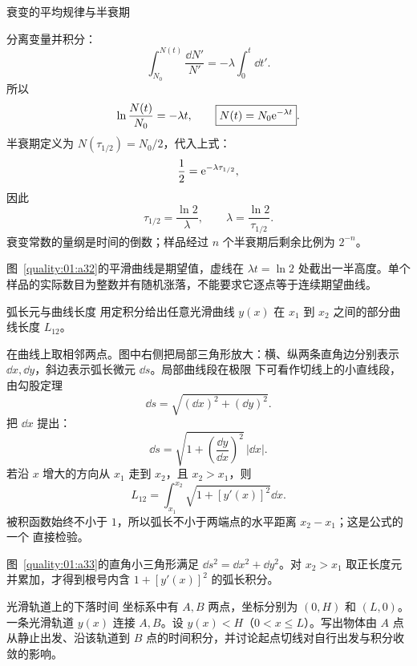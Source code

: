 {\begin{origexamplebox}{衰变的平均规律与半衰期}
\end{origexamplebox}

\begin{xesolution}
分离变量并积分：
\[
 \int_{N_0}^{N(t)}\frac{\dd N'}{N'}
 =-\lambda\int_0^t\dd t'.
\]
所以
\[
 \ln\frac{N(t)}{N_0}=-\lambda t,
 \qquad
 \boxed{N(t)=N_0\mathrm e^{-\lambda t}}.
\]
半衰期定义为 $N(\tau_{1/2})=N_0/2$，代入上式：
\[
 \frac12=\mathrm e^{-\lambda\tau_{1/2}},
\]
因此
\[
 \boxed{\tau_{1/2}=\frac{\ln2}{\lambda}},
 \qquad
 \boxed{\lambda=\frac{\ln2}{\tau_{1/2}}}.
\]
衰变常数的量纲是时间的倒数；样品经过 $n$ 个半衰期后剩余比例为 $2^{-n}$。


图~\ref{quality:01:a32}的平滑曲线是期望值，虚线在 $\lambda t=\ln2$ 处截出一半高度。单个样品的实际数目为整数并有随机涨落，不能要求它逐点等于连续期望曲线。
\end{xesolution}

\begin{origexamplebox}{弧长元与曲线长度}\label{ch01:ex:s15-1-28}
用定积分给出任意光滑曲线 $y(x)$ 在 $x_1$ 到 $x_2$ 之间的部分曲线长度 $L_{12}$。
\end{origexamplebox}

\begin{xesolution}
在曲线上取相邻两点。图中右侧把局部三角形放大：横、纵两条直角边分别表示
$\dd x,\dd y$，斜边表示弧长微元 $\dd s$。局部曲线段在极限
下可看作切线上的小直线段，由勾股定理
\[
 \dd s=\sqrt{(\dd x)^2+(\dd y)^2}.
\]
把 $\dd x$ 提出：
\[
 \dd s=\sqrt{1+\left(\frac{\dd y}{\dd x}\right)^2}\,|\dd x|.
\]
若沿 $x$ 增大的方向从 $x_1$ 走到 $x_2$，且 $x_2>x_1$，则
\[
 \boxed{L_{12}=\int_{x_1}^{x_2}
 \sqrt{1+[y'(x)]^2}\dd x}.
\]
被积函数始终不小于 $1$，所以弧长不小于两端点的水平距离 $x_2-x_1$；这是公式的一个
直接检验。


图~\ref{quality:01:a33}的直角小三角形满足 $\dd s^2=\dd x^2+\dd y^2$。对 $x_2>x_1$ 取正长度元并累加，才得到根号内含 $1+[y'(x)]^2$ 的弧长积分。
\end{xesolution}

\begin{origexamplebox}{光滑轨道上的下落时间}\label{ch01:ex:s15-1-29}
坐标系中有 $A,B$ 两点，坐标分别为 $(0,H)$ 和 $(L,0)$。一条光滑轨道 $y(x)$ 连接
$A,B$。设 $y(x)<H$（$0<x\le L$）。写出物体由 $A$ 点从静止出发、沿该轨道到 $B$ 点的时间积分，并讨论起点切线对自行出发与积分收敛的影响。
\end{origexamplebox}

}
